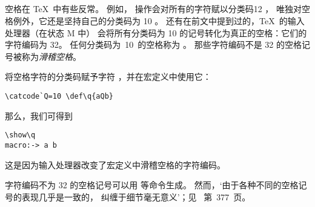 \documentclass{book}
\begin{document}
\subsection{}

空格在 \TeX\ 中有些反常。
例如， 操作会对所有的字符赋以分类码12 ，
唯独对空格例外，它还是坚持自己的分类码为 10 。
还有在前文中提到过的，\TeX\ 的输入处理器（在状态 {\italic M} 中）%
会将所有分类码为 10 的记号转化为真正的空格：它们的字符编码为 32。
任何分类码为~10~的空格称为 。
那些字符编码不是 32 的空格记号被称为{\em 滑稽空格}。

\begin{example}
将空格字符的分类码赋予字符 ，并在宏定义中使用它：
\begin{verbatim}
\catcode`Q=10 \def\q{aQb}
\end{verbatim}
那么，我们可得到
\begin{verbatim}
\show\q
macro:-> a b
\end{verbatim}
这是因为输入处理器改变了宏定义中滑稽空格的字符编码。
\end{example}

字符编码不为 32 的空格记号可以用  等命令生成。
然而，`由于各种不同的空格记号的表现几乎是一致的，
纠缠于细节毫无意义'；见~\cite{Knuth:TeXbook} 第~377~页。
\end{document}
